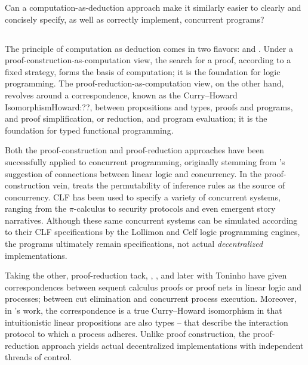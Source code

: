 Can a computation-as-deduction approach make it similarly easier to clearly and concisely specify, as well as correctly implement, concurrent programs?

\subsection{}

The principle of computation as deduction comes in two flavors:  and .
Under a proof-construction-as-computation view, the search for a proof, according to a fixed strategy, forms the basis of computation; it is the foundation for logic programming\autocites{Miller+:PAL91}{Andreoli:JLC92}.
The proof-reduction-as-computation view, on the other hand, revolves around a correspondence, known as the Curry--Howard Isomorphism\autocite{Curry:??}{Howard:??}, between propositions and types, proofs and programs, and proof simplification, or reduction, and program evaluation;
it is the foundation for typed functional programming\autocite{Martin-Lof:LMPS80}.

Both the proof-construction and proof-reduction approaches have been successfully applied to concurrent programming, originally stemming from \citeauthor{Girard:TCS87}'s suggestion of connections between linear logic and concurrency\autocite{Girard:TCS87}.
In the proof-construction vein,  treats the permutability of inference rules as the source of concurrency.
\Ac{CLF} has been used to specify a variety of concurrent systems, ranging from the $\pi$-calculus to security protocols and even emergent story narratives\autocites{Cervesato+Scedrov:IC09}{Martens+:LPNMR13}.
Although these same concurrent systems can be simulated according to their \ac{CLF} specifications by the Lollimon\autocite{Lopez+:PPDP05} and Celf\autocite{Schack-Nielsen:ITU11} logic programming engines, the programs ultimately remain specifications, not actual \emph{decentralized} implementations.

Taking the other, proof-reduction tack, \textcite{Abramsky:TCS93}, \textcite{Bellin+Scott:TCS94}, and later \textcite{Caires+Pfenning:CONCUR10} with Toninho\autocites{Caires+:TLDI12}{Caires+:MSCS13} have given correspondences between sequent calculus proofs or proof nets in linear logic and processes; between cut elimination and concurrent process execution.
Moreover, in \citeauthor{Caires+:MSCS13}'s work, the correspondence is a true Curry--Howard isomorphism in that intuitionistic linear propositions are also types -- \autocite{Honda:CONCUR93} that describe the interaction protocol to which a process adheres.
Unlike proof construction, the proof-reduction approach yields actual decentralized implementations with independent threads of control\autocites{Toninho+:ESOP13}{Griffith+Pfenning:14}.

